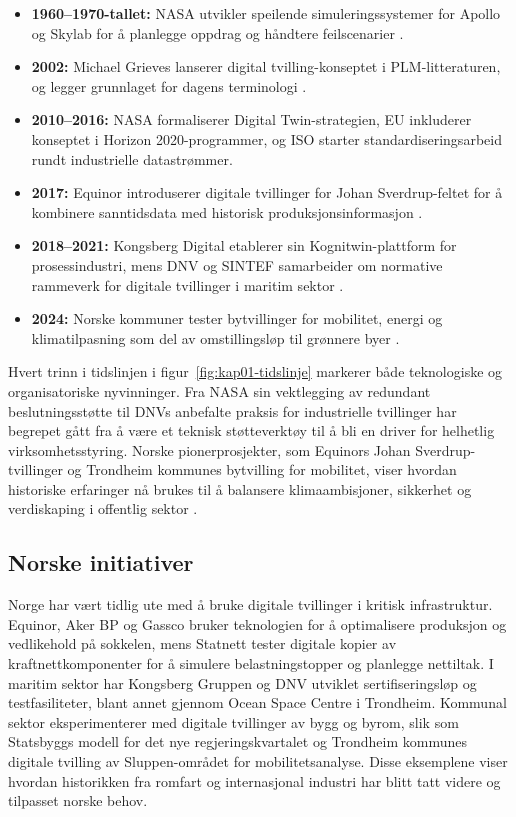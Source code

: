 \begin{itemize}
    \item \textbf{1960--1970-tallet:} NASA utvikler speilende simuleringssystemer for Apollo og Skylab for å planlegge oppdrag og håndtere feilscenarier \citep{glaessgen2012digital}.
    \item \textbf{2002:} Michael Grieves lanserer digital tvilling-konseptet i PLM-litteraturen, og legger grunnlaget for dagens terminologi \citep{grieves2017digital}.
    \item \textbf{2010--2016:} NASA formaliserer Digital Twin-strategien, EU inkluderer konseptet i Horizon 2020-programmer, og ISO starter standardiseringsarbeid rundt industrielle datastrømmer.
    \item \textbf{2017:} Equinor introduserer digitale tvillinger for Johan Sverdrup-feltet for å kombinere sanntidsdata med historisk produksjonsinformasjon \citep{equinor2021johansverdrup}.
    \item \textbf{2018--2021:} Kongsberg Digital etablerer sin Kognitwin-plattform for prosessindustri, mens DNV og SINTEF samarbeider om normative rammeverk for digitale tvillinger i maritim sektor \citep{dnv2021rp,sintef2021digital}.
    \item \textbf{2024:} Norske kommuner tester bytvillinger for mobilitet, energi og klimatilpasning som del av omstillingsløp til grønnere byer \citep{trondheim2024bytvilling}.
\end{itemize}

Hvert trinn i tidslinjen i figur~\ref{fig:kap01-tidslinje} markerer både teknologiske og organisatoriske nyvinninger. Fra NASA sin vektlegging av redundant beslutningsstøtte til DNVs anbefalte praksis for industrielle tvillinger \citep{dnv2021rp} har begrepet gått fra å være et teknisk støtteverktøy til å bli en driver for helhetlig virksomhetsstyring. Norske pionerprosjekter, som Equinors Johan Sverdrup-tvillinger og Trondheim kommunes bytvilling for mobilitet, viser hvordan historiske erfaringer nå brukes til å balansere klimaambisjoner, sikkerhet og verdiskaping i offentlig sektor \citep{equinor2021johansverdrup,trondheim2024bytvilling}.

\subsection{Norske initiativer}
Norge har vært tidlig ute med å bruke digitale tvillinger i kritisk infrastruktur. Equinor, Aker BP og Gassco bruker teknologien for å optimalisere produksjon og vedlikehold på sokkelen, mens Statnett tester digitale kopier av kraftnettkomponenter for å simulere belastningstopper og planlegge nettiltak. I maritim sektor har Kongsberg Gruppen og DNV utviklet sertifiseringsløp og testfasiliteter, blant annet gjennom Ocean Space Centre i Trondheim. Kommunal sektor eksperimenterer med digitale tvillinger av bygg og byrom, slik som Statsbyggs modell for det nye regjeringskvartalet og Trondheim kommunes digitale tvilling av Sluppen-området for mobilitetsanalyse. Disse eksemplene viser hvordan historikken fra romfart og internasjonal industri har blitt tatt videre og tilpasset norske behov.

